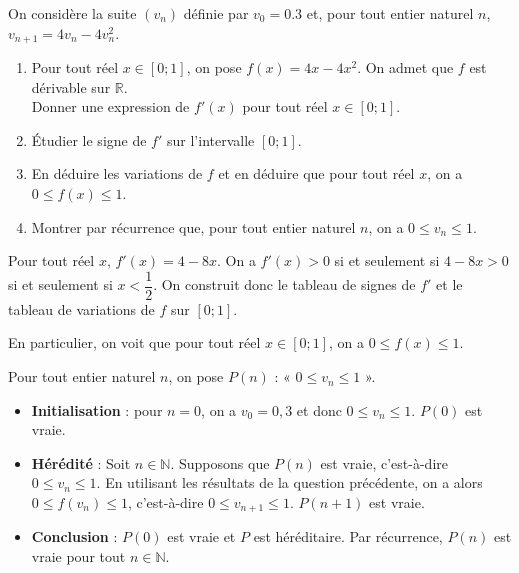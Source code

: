\documentclass[11pt,fleqn]{book} %
\begin{document}
\begin{exercise}[topic=rec02]On considère la suite $(v_n)$ définie par $v_0=0.3$ et, pour tout entier naturel $n$, $v_{n+1}=4v_n-4v_n^2$. 
\begin{enumerate}
\item Pour tout réel $x\in[0;1]$, on pose $f(x)=4x-4x^2$. On admet que $f$ est dérivable sur $\mathbb{R}$.\\ Donner une expression de $f'(x)$ pour tout réel $x\in [0;1]$.
\item Étudier le signe de $f'$ sur l'intervalle $[0;1]$.
\item En déduire les variations de $f$ et en déduire que pour tout réel $x$, on a $0\leqslant f(x) \leqslant 1$.
\item Montrer par récurrence que, pour tout entier naturel $n$, on a $0\leqslant v_n \leqslant 1$. 
\end{enumerate}\end{exercise}
\begin{solution}Pour tout réel $x$, $f'(x)=4-8x$. On a $f'(x) > 0$ si et seulement si $4-8x>0$ si et seulement si $x< \dfrac{1}{2}$. On construit donc le tableau de signes de $f'$ et le tableau de variations de $f$ sur $[0;1]$.

\begin{center}
\end{center}

En particulier, on voit que pour tout réel $x \in [0;1]$, on a $0 \leqslant f(x) \leqslant 1$. 

Pour tout entier naturel $n$, on pose $P(n)$ : « $0 \leqslant v_n\leqslant 1$ ».

\begin{itemize}
\item \textbf{Initialisation} : pour $n=0$, on a $v_0=0,3$ et donc $0 \leqslant v_n\leqslant 1$. $P(0)$ est vraie.
\item \textbf{Hérédité} : Soit $n\in\mathbb{N}$. Supposons que $P(n)$ est vraie, c'est-à-dire $0 \leqslant v_n\leqslant 1$. En utilisant les résultats de la question précédente, on a alors $0\leqslant f(v_n) \leqslant 1$, c'est-à-dire $0 \leqslant v_{n+1}\leqslant 1$. $P(n+1)$ est vraie.
\item \textbf{Conclusion} : $P(0)$ est vraie et $P$ est héréditaire. Par récurrence, $P(n)$ est vraie pour tout $n\in\mathbb{N}$.
\end{itemize}
\end{solution}
\end{document}
